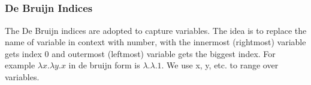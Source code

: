 {\begin{code}[hide]%
\>[0]\AgdaSpace{}%
\AgdaSpace{}%
\<%
\\
\>[0]\AgdaSpace{}%
\AgdaSpace{}%
\AgdaSpace{}%
\AgdaSpace{}%
\AgdaSymbol{:}\AgdaSpace{}%
\<%
\\
%
\\[\AgdaEmptyExtraSkip]%
\>[0]\AgdaSpace{}%
\AgdaSpace{}%
\<%
\\
\>[0]\AgdaSpace{}%
\AgdaSpace{}%
\AgdaSpace{}%
\AgdaSpace{}%
\AgdaSymbol{:}\AgdaSpace{}%
\<%
\end{code}

\subsubsection*{De Bruijn Indices}

The De Bruijn indices are adopted to capture variables. The idea is to replace the name of variable in context with number, with the innermost (rightmost) variable gets index 0 and outermost (leftmost) variable gets the biggest index. For example $\lambda x.\lambda y.x$ in de bruijn form is $\lambda.\lambda.1$. We use x, y, etc. to range over variables.

\begin{code}%
\>[0]\AgdaSpace{}%
\AgdaSpace{}%
\AgdaSymbol{:}\AgdaSpace{}%
\AgdaSpace{}%
\AgdaSpace{}%
\AgdaSpace{}%
\AgdaSpace{}%
\AgdaSpace{}%
\<%
\\
\>[0][@{}l@{\AgdaIndent{0}}]%
\>[2]\AgdaSpace{}%
\AgdaSymbol{:}\AgdaSpace{}%
\AgdaSpace{}%
\AgdaSymbol{(}\AgdaSpace{}%
\AgdaSpace{}%
\AgdaSymbol{)}\AgdaSpace{}%
\<%
\\
%
\>[2]\AgdaSpace{}%
\AgdaSymbol{:}\AgdaSpace{}%
\AgdaSpace{}%
\AgdaSpace{}%
\AgdaSpace{}%
\AgdaSpace{}%
\AgdaSpace{}%
\AgdaSymbol{(}\AgdaSpace{}%
\AgdaSpace{}%
\AgdaSymbol{)}\AgdaSpace{}%
\<%
\end{code}

}
